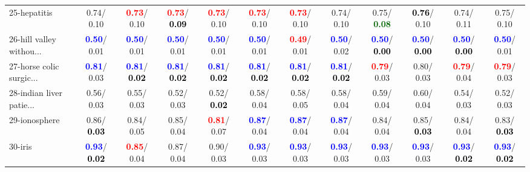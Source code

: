 \begin{table}[h]
\begin{center}
{\begin{tabular}{lc|c|c|c|c|c|c|c|c|c|c}
25-hepatitis &   0.74/  0.10 & \textcolor{red}{\textbf{  0.73}}/  0.10 & \textcolor{red}{\textbf{  0.73}}/\textcolor{black}{\textbf{  0.09}} & \textcolor{red}{\textbf{  0.73}}/  0.10 & \textcolor{red}{\textbf{  0.73}}/  0.10 & \textcolor{red}{\textbf{  0.73}}/  0.10 &   0.74/  0.10 &   0.75/\textcolor{darkgreen}{\textbf{  0.08}} & \textcolor{black}{\textbf{  0.76}}/  0.10 &   0.74/  0.11 &   0.75/  0.10 \\
26-hill valley withou... & \textcolor{blue}{\textbf{  0.50}}/  0.01 & \textcolor{blue}{\textbf{  0.50}}/  0.01 & \textcolor{blue}{\textbf{  0.50}}/  0.01 & \textcolor{blue}{\textbf{  0.50}}/  0.01 & \textcolor{blue}{\textbf{  0.50}}/  0.01 & \textcolor{red}{\textbf{  0.49}}/  0.01 & \textcolor{blue}{\textbf{  0.50}}/  0.02 & \textcolor{blue}{\textbf{  0.50}}/\textcolor{black}{\textbf{  0.00}} & \textcolor{blue}{\textbf{  0.50}}/\textcolor{black}{\textbf{  0.00}} & \textcolor{blue}{\textbf{  0.50}}/\textcolor{black}{\textbf{  0.00}} & \textcolor{blue}{\textbf{  0.50}}/  0.01 \\
27-horse colic surgic... & \textcolor{blue}{\textbf{  0.81}}/  0.03 & \textcolor{blue}{\textbf{  0.81}}/\textcolor{black}{\textbf{  0.02}} & \textcolor{blue}{\textbf{  0.81}}/\textcolor{black}{\textbf{  0.02}} & \textcolor{blue}{\textbf{  0.81}}/\textcolor{black}{\textbf{  0.02}} & \textcolor{blue}{\textbf{  0.81}}/\textcolor{black}{\textbf{  0.02}} & \textcolor{blue}{\textbf{  0.81}}/\textcolor{black}{\textbf{  0.02}} & \textcolor{blue}{\textbf{  0.81}}/\textcolor{black}{\textbf{  0.02}} & \textcolor{red}{\textbf{  0.79}}/  0.03 &   0.80/  0.03 & \textcolor{red}{\textbf{  0.79}}/  0.04 & \textcolor{red}{\textbf{  0.79}}/  0.03 \\
28-indian liver patie... &   0.56/  0.03 &   0.55/  0.03 &   0.52/  0.03 &   0.52/\textcolor{black}{\textbf{  0.02}} &   0.58/  0.04 &   0.58/  0.05 &   0.58/  0.04 &   0.59/  0.04 &   0.60/  0.04 &   0.54/  0.03 &   0.52/  0.03 \\ \hline
29-ionosphere &   0.86/\textcolor{black}{\textbf{  0.03}} &   0.84/  0.05 &   0.85/  0.04 & \textcolor{red}{\textbf{  0.81}}/  0.07 & \textcolor{blue}{\textbf{  0.87}}/  0.04 & \textcolor{blue}{\textbf{  0.87}}/  0.04 & \textcolor{blue}{\textbf{  0.87}}/  0.04 &   0.84/  0.04 &   0.85/\textcolor{black}{\textbf{  0.03}} &   0.84/  0.04 &   0.83/\textcolor{black}{\textbf{  0.03}} \\
30-iris & \textcolor{blue}{\textbf{  0.93}}/\textcolor{black}{\textbf{  0.02}} & \textcolor{red}{\textbf{  0.85}}/  0.04 &   0.87/  0.04 &   0.90/  0.03 & \textcolor{blue}{\textbf{  0.93}}/  0.03 & \textcolor{blue}{\textbf{  0.93}}/  0.03 & \textcolor{blue}{\textbf{  0.93}}/  0.03 & \textcolor{blue}{\textbf{  0.93}}/  0.03 & \textcolor{blue}{\textbf{  0.93}}/  0.03 & \textcolor{blue}{\textbf{  0.93}}/\textcolor{black}{\textbf{  0.02}} & \textcolor{blue}{\textbf{  0.93}}/\textcolor{black}{\textbf{  0.02}} \\

\end{tabular}}
\end{center}
\end{table}
